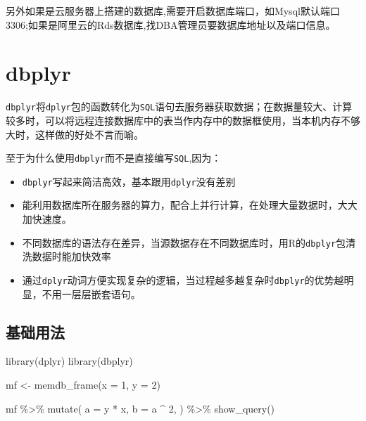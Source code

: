 \documentclass[
]{book}
\newenvironment{Shaded}{\begin{snugshade}}{\end{snugshade}}
\newcommand{\AttributeTok}[1]{\textcolor[rgb]{0.77,0.63,0.00}{#1}}
\newcommand{\DecValTok}[1]{\textcolor[rgb]{0.00,0.00,0.81}{#1}}
\newcommand{\FunctionTok}[1]{\textcolor[rgb]{0.00,0.00,0.00}{#1}}
\newcommand{\NormalTok}[1]{#1}
\newcommand{\OtherTok}[1]{\textcolor[rgb]{0.56,0.35,0.01}{#1}}
\newcommand{\SpecialCharTok}[1]{\textcolor[rgb]{0.00,0.00,0.00}{#1}}
\begin{document}
另外如果是云服务器上搭建的数据库,需要开启数据库端口，如Mysql默认端口3306;如果是阿里云的Rds数据库,找DBA管理员要数据库地址以及端口信息。

\hypertarget{dbplyr}{%
\section{dbplyr}\label{dbplyr}}

\texttt{dbplyr}将\texttt{dplyr}包的函数转化为\texttt{SQL}语句去服务器获取数据；在数据量较大、计算较多时，可以将远程连接数据库中的表当作内存中的数据框使用，当本机内存不够大时，这样做的好处不言而喻。

至于为什么使用\texttt{dbplyr}而不是直接编写\texttt{SQL},因为：

\begin{itemize}
\item
  \texttt{dbplyr}写起来简洁高效，基本跟用\texttt{dplyr}没有差别
\item
  能利用数据库所在服务器的算力，配合上并行计算，在处理大量数据时，大大加快速度。
\item
  不同数据库的语法存在差异，当源数据存在不同数据库时，用R的\texttt{dbplyr}包清洗数据时能加快效率
\item
  通过\texttt{dplyr}动词方便实现复杂的逻辑，当过程越多越复杂时\texttt{dbplyr}的优势越明显，不用一层层嵌套语句。
\end{itemize}

\hypertarget{ux57faux7840ux7528ux6cd5}{%
\subsection{基础用法}\label{ux57faux7840ux7528ux6cd5}}

\begin{Shaded}
\begin{Highlighting}[]
\FunctionTok{library}\NormalTok{(dplyr)}
\FunctionTok{library}\NormalTok{(dbplyr)}

\NormalTok{mf }\OtherTok{\textless{}{-}} \FunctionTok{memdb\_frame}\NormalTok{(}\AttributeTok{x =} \DecValTok{1}\NormalTok{, }\AttributeTok{y =} \DecValTok{2}\NormalTok{)}

\NormalTok{mf }\SpecialCharTok{\%\textgreater{}\%} 
  \FunctionTok{mutate}\NormalTok{(}
    \AttributeTok{a =}\NormalTok{ y }\SpecialCharTok{*}\NormalTok{ x, }
    \AttributeTok{b =}\NormalTok{ a }\SpecialCharTok{\^{}} \DecValTok{2}\NormalTok{,}
\NormalTok{  ) }\SpecialCharTok{\%\textgreater{}\%} 
  \FunctionTok{show\_query}\NormalTok{()}
\end{Highlighting}
\end{Shaded}
\end{document}
